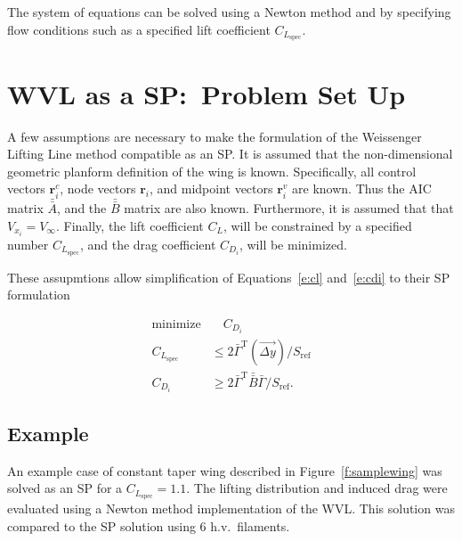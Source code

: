 \documentclass[10pt, a4paper]{article}
\begin{document}
The system of equations can be solved using a Newton method and by specifying flow conditions such as a specified lift coefficient $C_{L_{\mathrm{spec}}}$.

\section*{WVL as a SP:\ Problem Set Up}

A few assumptions are necessary to make the formulation of the Weissenger Lifting Line method compatible as an SP.  It is assumed that the non-dimensional geometric planform definition of the wing is known.  
Specifically, all control vectors $\mathbf{r}_i^c$, node vectors $\mathbf{r}_i$, and midpoint vectors $\mathbf{r}_i^v$ are known.  Thus the AIC matrix $\bar{\bar{A}}$, and the $\bar{\bar{B}}$ matrix are also known.  
Furthermore, it is assumed that that $V_{x_i} = V_{\infty}$.  
Finally, the lift coefficient $C_L$, will be constrained by a specified number $C_{L_{\mathrm{spec}}}$, and the drag coefficient $C_{D_i}$, will be minimized.

These assupmtions allow simplification of Equations~\ref{e:cl} and~\ref{e:cdi} to their SP formulation

\begin{align}
    \text{minimize} & \quad C_{D_i} \nonumber \\
    \label{e:cleq}
    C_{L_{\mathrm{spec}}} &\leq 2 \bar{\Gamma}^{\mathrm{T}} (\vec{\Delta y})/S_{\mathrm{ref}} \\
    \label{e:cdeq}
    C_{D_i} &\geq 2 \bar{\Gamma}^{\mathrm{T}} \bar{\bar{B}} \bar{\Gamma}/S_{\mathrm{ref}}.
\end{align}

\subsection*{Example}

An example case of constant taper wing described in Figure~\ref{f:samplewing} was solved as an SP for a $C_{L_{\mathrm{spec}}} = 1.1$.
The lifting distribution and induced drag were evaluated using a Newton method implementation of the WVL. This solution was compared to the SP solution using 6 h.v.\ filaments. 
\end{document}
